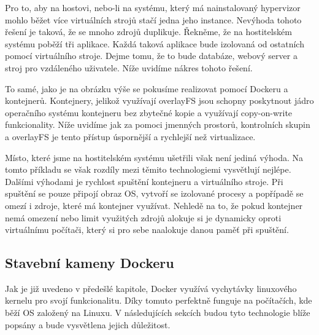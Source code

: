 Pro to, aby na hostovi, nebo-li na systému, který má nainstalovaný hypervizor mohlo běžet více virtuálních strojů stačí jedna jeho instance. Nevýhoda tohoto řešení je taková, že se mnoho zdrojů duplikuje. Řekněme, že na hostitelském systému poběží tři aplikace. Každá taková aplikace bude izolovaná od ostatních pomocí virtuálního stroje. Dejme tomu, že to bude databáze, webový server a stroj pro vzdáleného uživatele. Níže uvidíme nákres tohoto řešení. 



To samé, jako je na obrázku výše se pokusíme realizovat pomocí Dockeru a kontejnerů. Kontejnery, jelikož využívají overlayFS jsou schopny poskytnout jádro operačního systému kontejneru bez zbytečné kopie a využívají copy-on-write funkcionality. Níže uvidíme jak za pomoci jmenných prostorů, kontrolních skupin a overlayFS je tento přístup úspornější a rychlejší než virtualizace. 



Místo, které jsme na hostitelském systému ušetřili však není jediná výhoda. Na tomto příkladu se však rozdíly mezi těmito technologiemi vysvětlují nejlépe. Dalšími výhodami je rychlost spuštění kontejneru a virtuálního stroje. Při spuštění se pouze připojí obraz OS, vytvoří se izolované procesy a popřípadě se omezí i zdroje, které má kontejner využívat. Nehledě na to, že pokud kontejner nemá omezení nebo limit využitých zdrojů alokuje si je dynamicky oproti virtuálnímu počítači, který si pro sebe naalokuje danou paměť při spuštění.  


\subsection{Stavební kameny Dockeru}

Jak je již uvedeno v předešlé kapitole, Docker využívá vychytávky linuxového kernelu pro svojí funkcionalitu. Díky tomuto perfektně funguje na počítačích, kde běží OS založený na Linuxu. V následujících sekcích budou tyto technologie blíže popsány a bude vysvětlena jejich důležitost. 

